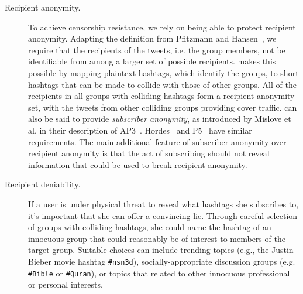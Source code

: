 \begin{description}
\item[Recipient anonymity.] To achieve censorship resistance, we rely on
  being able to protect recipient anonymity. Adapting the definition
  from Pfitzmann and Hansen~\cite{terminology}, we require that the
  recipients of the tweets, i.e. the group members, not be identifiable
  from among a larger set of possible recipients. \hoot makes this
  possible by mapping plaintext hashtags, which identify the groups, to
  short hashtags that can be made to collide with those of other
  groups. All of the recipients in all groups with colliding hashtags
  form a recipient anonymity set, with the tweets from other colliding
  groups providing cover traffic. \hoot can also be said to provide
  {\em subscriber anonymity}, as introduced by Mislove et al. in their
  description of AP3~\cite{ap3}. Hordes~\cite{hordes} and P5~\cite{P5}
  have similar requirements. The main additional feature of subscriber
  anonymity over recipient anonymity is that the act of subscribing
  should not reveal information that could be used to break recipient
  anonymity.


\item[Recipient deniability.] If a \hoot user is under physical threat to
  reveal what hashtags she subscribes to, it's important that she can
  offer a convincing lie. Through careful selection of groups with
  colliding hashtags, she could name the hashtag of an innocuous group
  that could reasonably be of interest to members of the target group.
  Suitable choices can include trending topics (e.g., the Justin Bieber
  movie hashtag {\tt \#nsn3d}), socially-appropriate discussion groups
  (e.g. {\tt \#Bible} or {\tt \#Quran}), or topics that related to
  other innocuous professional or personal interests.


\end{description}
